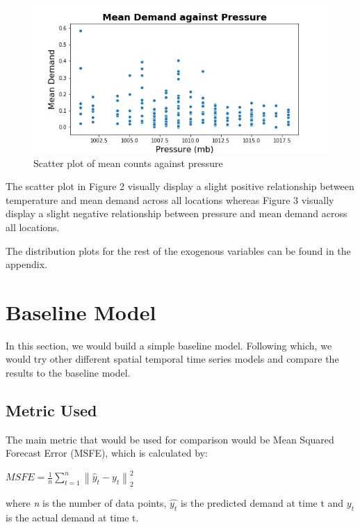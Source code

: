 \documentclass[10pt, letterpaper] {article}
\begin{document}
\begin{figure}[H]
    \centering
    \includegraphics[width=\textwidth]{Images/pressure_mean_demand.jpg}
    \caption{Scatter plot of mean counts against pressure}
    \label{fig:Scatter plot of mean counts against pressure}
\end{figure}

The scatter plot in Figure 2 visually display a slight positive relationship between temperature and mean demand across all locations whereas Figure 3 visually display a slight negative relationship between pressure and mean demand across all locations. 

The distribution plots for the rest of the exogenous variables can be found in the appendix. 


\section{Baseline Model}
In this section, we would build a simple baseline model. Following which, we would try other different spatial temporal time series models and compare the results to the baseline model. 

\subsection{Metric Used}
The main metric that would be used for comparison would be Mean Squared Forecast Error (MSFE), which is calculated by:

\begin{center}
    $\displaystyle MSFE=\frac{1}{n}\sum_{t=1}^{n}\left \| \hat{y}_{t} - y_{t} \right \|_{2}^{2}$
\end{center}
where \textit{n} is the number of data points, $\hat{y_t}$ is the predicted demand at time t and ${y_t}$ is the actual demand at time t.
\end{document}

